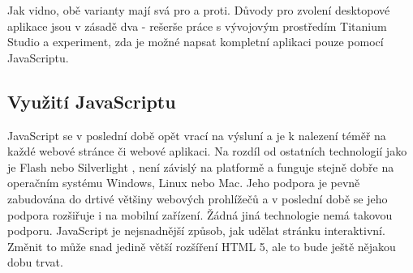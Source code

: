 Jak vidno, obě varianty mají svá pro a proti. Důvody pro zvolení desktopové aplikace jsou v zásadě dva - rešerše práce s vývojovým prostředím Titanium Studio a experiment, zda je možné napsat kompletní aplikaci pouze pomocí JavaScriptu. 

\subsection{Využití JavaScriptu}

JavaScript se v poslední době opět vrací na výsluní a je k nalezení téměř na každé webové stránce či webové aplikaci. Na rozdíl od ostatních technologií jako je Flash \cite{flash} nebo Silverlight \cite{silverlight}, není závislý na platformě a funguje stejně dobře na operačním systému Windows, Linux nebo Mac. Jeho podpora je pevně zabudována do drtivé většiny webových prohlížečů a v poslední době se jeho podpora rozšiřuje i na mobilní zařízení. Žádná jiná technologie nemá takovou podporu. JavaScript je nejsnadnější způsob, jak udělat stránku interaktivní. Změnit to může snad jedině větší rozšíření HTML 5, ale to bude ještě nějakou dobu trvat.